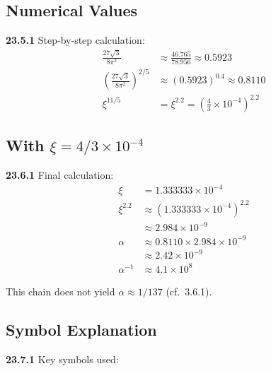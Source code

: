 \subsection{Numerical Values}
\noindent \textbf{23.5.1} Step-by-step calculation:
\begin{align}
	\frac{27\sqrt{3}}{8\pi^2} &\approx \frac{46.765}{78.956} \approx 0.5923 \\
	\left(\frac{27\sqrt{3}}{8\pi^2}\right)^{2/5} &\approx (0.5923)^{0.4} \approx 0.8110 \\
	\xi^{11/5} &= \xi^{2.2} = \left(\frac{4}{3} \times 10^{-4}\right)^{2.2}
\end{align}

\subsection{With $\xi = 4/3 \times 10^{-4}$}
\noindent \textbf{23.6.1} Final calculation:
\begin{align}
	\xi &= 1.333333 \times 10^{-4} \\
	\xi^{2.2} &\approx (1.333333 \times 10^{-4})^{2.2} \\
	&\approx 2.984 \times 10^{-9} \\
	\alpha &\approx 0.8110 \times 2.984 \times 10^{-9} \\
	&\approx 2.42 \times 10^{-9} \\
	\alpha^{-1} &\approx 4.1 \times 10^{8}
\end{align}

This chain does not yield $\alpha \approx 1/137$ (cf.\ 3.6.1).

\subsection{Symbol Explanation}

\noindent \textbf{23.7.1} Key symbols used:


